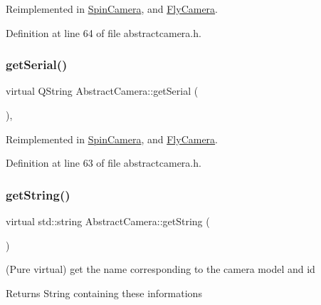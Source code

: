 Reimplemented in \mbox{\hyperlink{class_spin_camera_a254522436d6e70878a8b2df0654614c8}{Spin\+Camera}}, and \mbox{\hyperlink{class_fly_camera_ae161d0e4afa9abfc87aec13263d6cadb}{Fly\+Camera}}.



Definition at line 64 of file abstractcamera.\+h.

\mbox{\label{class_abstract_camera_a0dcd65fa3bcc83ba95ffdb0a9044a407}} 
\subsubsection{\texorpdfstring{getSerial()}{getSerial()}}
{\footnotesize\ttfamily virtual Q\+String Abstract\+Camera\+::get\+Serial (\begin{DoxyParamCaption}{ }\end{DoxyParamCaption})\hspace{0.3cm}{\ttfamily [inline]}, {\ttfamily [virtual]}}



Reimplemented in \mbox{\hyperlink{class_spin_camera_a2427902f7a8bc6cca397966b14399e9b}{Spin\+Camera}}, and \mbox{\hyperlink{class_fly_camera_a2f6857dd2270d473f3d4ecb590b5dcab}{Fly\+Camera}}.



Definition at line 63 of file abstractcamera.\+h.

\mbox{\label{class_abstract_camera_a75dc6b53d5a8717944d5e8ded9609611}} 
\subsubsection{\texorpdfstring{getString()}{getString()}}
{\footnotesize\ttfamily virtual std\+::string Abstract\+Camera\+::get\+String (\begin{DoxyParamCaption}{ }\end{DoxyParamCaption})\hspace{0.3cm}{\ttfamily [pure virtual]}}



(Pure virtual) get the name corresponding to the camera model and id 

\begin{DoxyReturn}{Returns}
String containing these informations 
\end{DoxyReturn}



